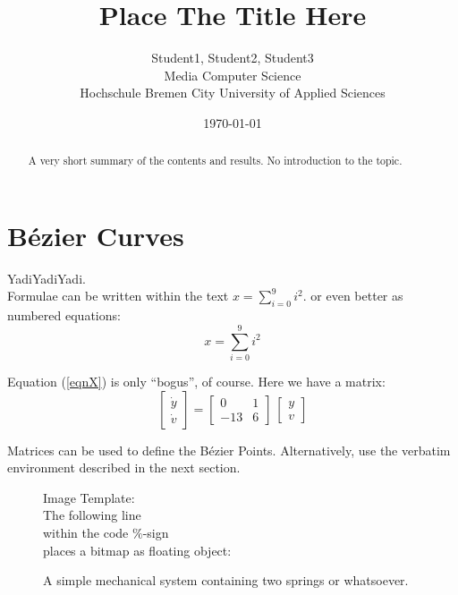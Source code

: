 \documentclass[a4paper,pdftex,12pt]{article}
\title{%
    Place The Title Here}
\author{
    Student1, Student2, Student3 \\ Media Computer Science\\ Hochschule Bremen City University of Applied Sciences}
\date{ \today}
\begin{document}

\maketitle
\begin{abstract}
	A very short summary of the contents and results. No introduction to the topic.
\end{abstract}





\section{Bézier Curves}

YadiYadiYadi.\\

Formulae can be written within the text $ x = \sum_{i=0}^9 i^2$.
or even better as numbered equations:
\begin{equation} \label{eqnX}  
    x = \sum_{i=0}^9 i^2
\end{equation}

Equation (\ref{eqnX}) is only "`bogus"', of course. Here we have a matrix:
\begin{equation} \label{eqnSys}
    \left[ \begin{array}{c} \dot y \\ \dot v \end{array}\right]
    = \left[ \begin{array}{cc} 0 &1 \\ -13 &6 \end{array}\right]\
		\left[ \begin{array}{c} y \\ v \end{array}\right]
\end{equation}

Matrices can be used to define the Bézier Points. Alternatively, use the 
verbatim environment described in the next section.

  
\begin{figure}[htb]
\centering
  Image Template:\\ The following line\\ within the code $\% $-sign\\ places a bitmap as floating object:
\it \caption{\label{abbMech}
	A simple mechanical system containing two springs or whatsoever. 
}
\end{figure}
	
\end{document}
